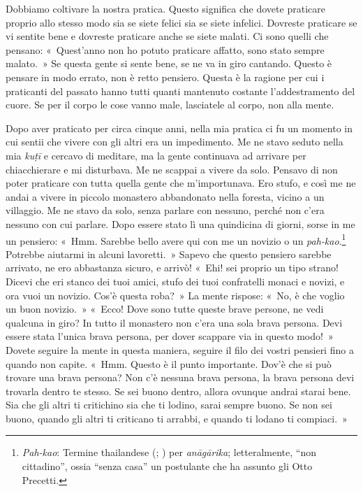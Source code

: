 Dobbiamo coltivare la nostra pratica. Questo significa che dovete
praticare proprio allo stesso modo sia se siete felici sia se siete
infelici. Dovreste praticare se vi sentite bene e dovreste praticare
anche se siete malati. Ci sono quelli che pensano: «~Quest'anno non ho
potuto praticare affatto, sono stato sempre malato.~» Se questa gente si
sente bene, se ne va in giro cantando. Questo è pensare in modo errato,
non è retto pensiero. Questa è la ragione per cui i praticanti del
passato hanno tutti quanti mantenuto costante l'addestramento del cuore.
Se per il corpo le cose vanno male, lasciatele al corpo, non alla mente.

Dopo aver praticato per circa cinque anni, nella mia pratica ci fu un
momento in cui sentii che vivere con gli altri era un impedimento. Me ne
stavo seduto nella mia \emph{kuṭī} e cercavo di meditare, ma la gente
continuava ad arrivare per chiacchierare e mi disturbava. Me ne scappai
a vivere da solo. Pensavo di non poter praticare con tutta quella gente
che m'importunava. Ero stufo, e così me ne andai a vivere in piccolo
monastero abbandonato nella foresta, vicino a un villaggio. Me ne stavo
da solo, senza parlare con nessuno, perché non c'era nessuno con cui
parlare. Dopo essere stato lì una quindicina di giorni, sorse in me un
pensiero: «~Hmm. Sarebbe bello avere qui con me un novizio o un
\emph{pah-kao}.\footnote{\emph{Pah-kao}: Termine thailandese (;
  ) per \emph{anāgārika}; letteralmente, ``non cittadino'', ossia
  ``senza casa'' un postulante che ha assunto gli Otto Precetti.}
Potrebbe aiutarmi in alcuni lavoretti.~» Sapevo che questo pensiero
sarebbe arrivato, ne ero abbastanza sicuro, e arrivò! «~Ehi! sei proprio
un tipo strano! Dicevi che eri stanco dei tuoi amici, stufo dei tuoi
confratelli monaci e novizi, e ora vuoi un novizio. Cos'è questa roba?~»
La mente rispose: «~No, è che voglio un buon novizio.~» «~Ecco! Dove
sono tutte queste brave persone, ne vedi qualcuna in giro? In tutto il
monastero non c'era una sola brava persona. Devi essere stata l'unica
brava persona, per dover scappare via in questo modo!~» Dovete seguire
la mente in questa maniera, seguire il filo dei vostri pensieri fino a
quando non capite. «~Hmm. Questo è il punto importante. Dov'è che si può
trovare una brava persona? Non c'è nessuna brava persona, la brava
persona devi trovarla dentro te stesso. Se sei buono dentro, allora
ovunque andrai starai bene. Sia che gli altri ti critichino sia che ti
lodino, sarai sempre buono. Se non sei buono, quando gli altri ti
criticano ti arrabbi, e quando ti lodano ti compiaci.~»

